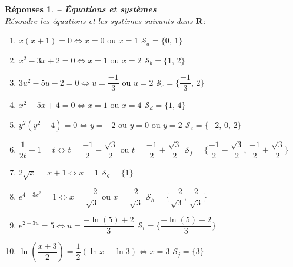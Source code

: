 \documentclass[a4paper,11pt]{article}
\newenvironment{alphate}{\begin{enumerate}[label=\alph*)]}{\end{enumerate}}
\newtheorem{rep}{R\'eponses}
\newenvironment{reponse}{\begin{rep} \em}{\end{rep}}
\begin{document}

\begin{reponse} {\bf -- \'Equations et syst\`emes} \\ 
R\'esoudre les \'equations et les syst\`emes suivants dans $\mathbf{R}$:
\begin{alphate}
\item $x(x+1)=0 \Leftrightarrow
    x = 0 \text{ ou } x = 1$ \hspace{1cm} 
    $\boxed{\mathcal{S}_a = \{0, \, 1\} }$ 
\item $x^2-3x+2 = 0 \Leftrightarrow 
    x=1 \text{ ou } x=2$ \hspace{1cm} 
    $\boxed{\mathcal{S}_b = \{ 1, \, 2\} }$ 
\item $3u^2-5u-2 = 0 \Leftrightarrow 
    u=\dfrac{-1}{3} \text{ ou } u = 2$ \hspace{1cm} 
    $\boxed{\mathcal{S}_c = \{\dfrac{-1}{3}, \, 2\} }$
\item $x^2-5x+4=0 \Leftrightarrow 
    x=1 \text{ ou } x=4$ \hspace{1cm} 
    $\boxed{\mathcal{S}_d = \{1, \, 4\} }$
\item $y^2(y^2-4)=0 \Leftrightarrow 
    y = -2 \text{ ou } y = 0 \text{ ou } y = 2$ \hspace{1cm} $\boxed{\mathcal{S}_e = \{-2, \, 0, \, 2\} }$ 
\item $\dfrac{1}{2t}-1 = t \Leftrightarrow 
    t=\dfrac{-1}{2}-\dfrac{\sqrt{3}}{2} 
    \text{ ou }  
    t=\dfrac{-1}{2}+\dfrac{\sqrt{3}}{2}$ \hspace{1cm} 
    $\boxed{\mathcal{S}_f = \{
        \dfrac{-1}{2}-\dfrac{\sqrt{3}}{2}, \, 
        \dfrac{-1}{2}+\dfrac{\sqrt{3}}{2}\} }$
\item $ 2\sqrt{x}= x+1 \Leftrightarrow x=1$ \hspace{1cm}
    $\boxed{\mathcal{S}_g = \{ 1 \} }$ 
\item $e^{4-3x^2} = 1 \Leftrightarrow 
    x=\dfrac{-2}{\sqrt{3}}  \text{ ou } x=\dfrac{2}{\sqrt{3}}$ \hspace{1cm}
    $\boxed{\mathcal{S}_h = \{\dfrac{-2}{\sqrt{3}}, \, \dfrac{2}{\sqrt{3}}\} }$ 
\item $e^{2-3u} = 5 \Leftrightarrow 
    u = \dfrac{-\ln(5)+2}{3}$ \hspace{1cm} 
    $\boxed{\mathcal{S}_i = \{\dfrac{-\ln(5)+2}{3}\} }$ 
\item $\ln\left(\dfrac{x+3}{2}\right)=\dfrac{1}{2}(\ln x+\ln 3) \Leftrightarrow 
    x=3$ \hspace{1cm} $\boxed{\mathcal{S}_j = \{3\} }$ 

\end{alphate}
\end{reponse}
\end{document}
